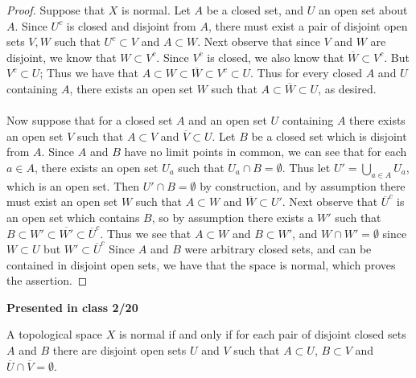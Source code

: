\documentclass[a4paper,12pt,twoside]{hmcpset}
\begin{document}
\begin{proof}
    Suppose that $X$ is normal. Let $A$ be a closed set, and 
    $U$ an open set about $A$. 
    Since $U^c$ is closed and disjoint from $A$, 
    there must exist a pair of disjoint open sets $V, W$ 
    such that $U^c \subset V$ and $A \subset W$.
    Next observe that since $V$ and $W$ are disjoint, we know
    that $W \subset V^c$. Since $V^c$ is closed, we also know that 
    $\overline{W} \subset V^c$. But $V^c \subset U$; Thus we have that 
    $A \subset W \subset \overline{W} \subset V^c \subset U$. Thus for 
    every closed $A$ and $U$ containing $A$, there exists an open 
    set $W$ such that $A \subset \overline{W} \subset U$, as desired.
    \\
    \\
    Now suppose that for a closed set $A$ and an open set $U$ containing 
    $A$ there exists an open set $V$ such that $A \subset V$ and $\overline{V} 
    \subset U$. Let $B$ be a closed set which is disjoint from $A$. Since 
    $A$ and $B$ have no limit points in common, we can see that for each $a \in A$, 
    there exists an open set $U_a$ such that $U_a \cap B = \emptyset.$ Thus 
    let $U' = \bigcup\limits_{a \in A} U_a$, which is an open set. 
    Then $U' \cap B = \emptyset$ by construction, and by assumption there 
    must exist an open set $W$ such that $A \subset W$ and $\overline{W} \subset
    U'$.
    Next observe that $\overline{U}^c$ is an open set which contains $B$, so by 
    assumption there exists a $W'$ such that $B \subset W' \subset \overline{W'}
    \subset \overline{U}^c$. Thus we see that $A \subset W$ and $B \subset W'$,
    and $W \cap W' = \emptyset$ since $W \subset U$ but $W' \subset \overline{U}^c$
    Since $A$ and $B$ were arbitrary closed sets, and can be contained in
    disjoint open sets,
    we have that the space is normal, which proves the assertion.
   
\end{proof}
\textbf{Presented in class 2/20}\\
\begin{problem}[Theorem 5.10] A topological space $X$ is normal if and
    only if for each pair of disjoint closed sets $A$ and $B$ there
    are disjoint open sets $U$ and $V$ such that $A \subset U$, $B
    \subset V$ and $\overline{U}\cap\overline{V} = \emptyset$.
\end{problem}
\end{document}
